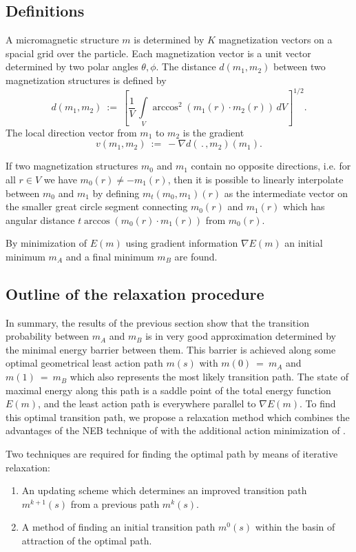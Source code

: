 
\subsection{Definitions}
A micromagnetic structure $m$ is determined by
$K$ magnetization vectors on a spacial grid over the particle.
Each magnetization vector is a unit vector determined by two
polar angles $\theta, \phi$.
The distance $d(m_1,m_2)$ between two magnetization structures is defined by
\begin{equation}\label{dist}
   d(m_1,m_2)~:=~ \left[ \frac{1}{V} \, \int \limits_V \arccos^2 ( m_1(r) \cdot m_2(r) ) \,dV\right]^{1/2}.
\end{equation}
The local direction vector from $m_1$ to $m_2$ is the gradient
\begin{equation}\label{dir}
  v(m_1,m_2)~:=~ -\nabla  d(\,.\,,m_2) (m_1).
\end{equation}

If two magnetization structures $m_0$ and $m_1$ contain no
opposite directions, i.e. for all $r\in V$ we have $ m_0(r) \neq -m_1(r)$,
then it is possible to linearly interpolate between $m_0$ and $m_1$ by
defining $ m_t(m_0,m_1) (r) $ as the intermediate vector
on the smaller  great circle segment connecting $m_0(r)$ and $m_1(r)$ which
has angular distance $t \arccos(m_0(r) \cdot m_1(r))$ from $m_0(r)$.

By minimization of $E(m)$
using gradient information $\nabla E (m)$
an initial minimum $m_A$ and a final minimum $m_B$
are found.


\subsection{Outline of the relaxation procedure}
In summary, the results of the previous section show that the transition probability
between $m_A$ and   $m_B$ is in very good approximation determined by the 
minimal energy barrier between them.
This barrier is achieved along some optimal geometrical least action path 
$m(s)$ with $m(0)~=~m_A$ and $m(1)~=~m_B$ which also represents the most 
likely transition path.
The state of maximal energy along this path is a saddle point of the 
total energy function $E(m)$, and the least action path is  everywhere parallel to 
$\nabla E(m)$.
%
To find this optimal transition path, we propose a relaxation method 
which combines the advantages of the NEB technique of \cite{Dittrich:02}
with the additional action minimization of \cite{Berkov:98b}. 


Two techniques are required for finding the optimal path by means of iterative 
relaxation: 
\begin{enumerate}
  \item  An updating scheme which determines an improved transition path $m^{k+1}(s)$
  from a previous path $m^k(s)$.
  \item A method of finding an initial transition path $m^0(s)$ within the basin of attraction of 
   the optimal path.
\end{enumerate}

